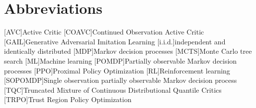 
\chapter{Abbreviations}
\begin{acronym}
    [AVC]{Active Critic}
    [COAVC]{Continued Observation Active Critic}
    [GAIL]{Generative Adversarial Imitation Learning}
    [i.i.d.]{independent and identically distributed}
    [MDP]{Markov decision processes}
    [MCTS]{Monte Carlo tree search}
    [ML]{Machine learning}
    [POMDP]{Partially observable Markov decision processes}
    [PPO]{Proximal Policy Optimization}
    [RL]{Reinforcement learning}
    [SOPOMDP]{Single observation partially observable Markov decision process}
    [TQC]{Truncated Mixture of Continuous Distributional Quantile Critics}
    [TRPO]{Trust Region Policy Optimization}
\end{acronym}
